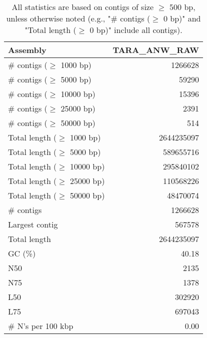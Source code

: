 \documentclass[12pt,a4paper]{article}
\begin{document}
\begin{table}[ht]
\begin{center}
\caption{All statistics are based on contigs of size $\geq$ 500 bp, unless otherwise noted (e.g., "\# contigs ($\geq$ 0 bp)" and "Total length ($\geq$ 0 bp)" include all contigs).}
\begin{tabular}{|l*{1}{|r}|}
\hline
Assembly & TARA\_ANW\_RAW \\ \hline
\# contigs ($\geq$ 1000 bp) & 1266628 \\ \hline
\# contigs ($\geq$ 5000 bp) & 59290 \\ \hline
\# contigs ($\geq$ 10000 bp) & 15396 \\ \hline
\# contigs ($\geq$ 25000 bp) & 2391 \\ \hline
\# contigs ($\geq$ 50000 bp) & 514 \\ \hline
Total length ($\geq$ 1000 bp) & 2644235097 \\ \hline
Total length ($\geq$ 5000 bp) & 589655716 \\ \hline
Total length ($\geq$ 10000 bp) & 295840102 \\ \hline
Total length ($\geq$ 25000 bp) & 110568226 \\ \hline
Total length ($\geq$ 50000 bp) & 48470074 \\ \hline
\# contigs & 1266628 \\ \hline
Largest contig & 567578 \\ \hline
Total length & 2644235097 \\ \hline
GC (\%) & 40.18 \\ \hline
N50 & 2135 \\ \hline
N75 & 1378 \\ \hline
L50 & 302920 \\ \hline
L75 & 697043 \\ \hline
\# N's per 100 kbp & 0.00 \\ \hline
\end{tabular}
\end{center}
\end{table}
\end{document}
